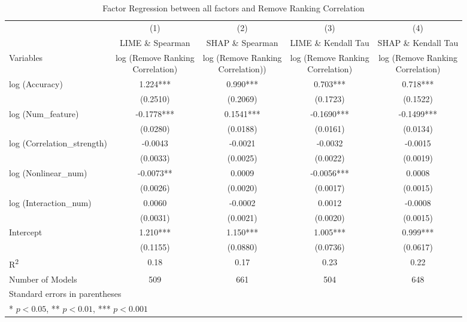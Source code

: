 \documentclass{article}
\begin{document}
\begin{landscape}
\begin{table}[H]
\centering
\caption{Factor Regression between all factors and Remove Ranking Correlation}
\begin{tabular}{lcccc}
\toprule
 & (1) & (2) & (3) & (4) \\
 & LIME \& Spearman & SHAP \& Spearman & LIME \& Kendall Tau & SHAP \& Kendall Tau \\

Variables & \makecell{log (Remove Ranking \\Correlation)} & \makecell{log (Remove Ranking \\Correlation)}) & \makecell{log (Remove Ranking \\Correlation)} & \makecell{log (Remove Ranking \\Correlation)} \\
\midrule
log (Accuracy) & 1.224*** & 0.990*** & 0.703*** & 0.718*** \\
 & (0.2510) & (0.2069) & (0.1723) & (0.1522) \\
log (Num\_feature) & -0.1778*** & 0.1541*** & -0.1690*** & -0.1499*** \\
 & (0.0280) & (0.0188) & (0.0161) & (0.0134) \\
log (Correlation\_strength) & -0.0043 & -0.0021 & -0.0032 & -0.0015 \\
 & (0.0033) & (0.0025) & (0.0022) & (0.0019) \\
log (Nonlinear\_num) & -0.0073** & 0.0009 & -0.0056*** & 0.0008 \\
 & (0.0026) & (0.0020) & (0.0017) & (0.0015) \\
log (Interaction\_num) & 0.0060 & -0.0002 & 0.0012 & -0.0008 \\
 & (0.0031) & (0.0021) & (0.0020) & (0.0015) \\
Intercept & 1.210*** & 1.150*** & 1.005*** & 0.999*** \\
 & (0.1155) & (0.0880) & (0.0736) & (0.0617) \\
\midrule
R\textsuperscript{2} & 0.18 & 0.17 & 0.23 & 0.22 \\
Number of Models & 509 & 661 & 504 & 648 \\
\bottomrule
\multicolumn{5}{l}{Standard errors in parentheses} \\
\multicolumn{5}{l}{* $p<0.05$, ** $p<0.01$, *** $p<0.001$} \\
\end{tabular}
\end{table}
\end{landscape}
\end{document}

